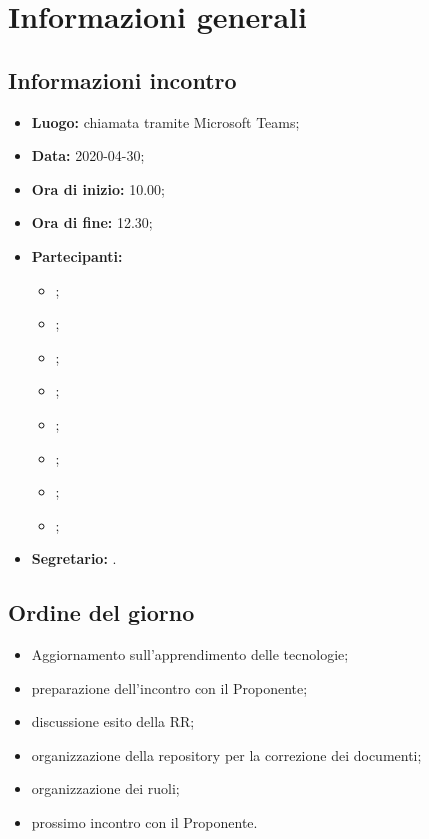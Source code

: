 \section{Informazioni generali}
\subsection{Informazioni incontro}
\begin{itemize}
	\item \textbf{Luogo:} chiamata tramite Microsoft Teams; 
	\item \textbf{Data:} 2020-04-30;
	\item \textbf{Ora di inizio:} 10.00; 
	\item \textbf{Ora di fine:} 12.30; 
	\item \textbf{Partecipanti:}
		\begin{itemize}
			\item \VB; 
			\item \LB; 
			\item \NF; 
			\item \EG; 
			\item \FJ; 
			\item \MP; 
			\item \AS; 
			\item \AZ; 
		\end{itemize}
	\item \textbf{Segretario:} \MP. 
\end{itemize}

\subsection{Ordine del giorno}
\begin{itemize}
	\item Aggiornamento sull'apprendimento delle tecnologie;
	\item preparazione dell'incontro con il Proponente; 
	\item discussione esito della RR;
	\item organizzazione della repository per la correzione dei documenti;
	\item organizzazione dei ruoli; 
	\item prossimo incontro con il Proponente.
\end{itemize}
